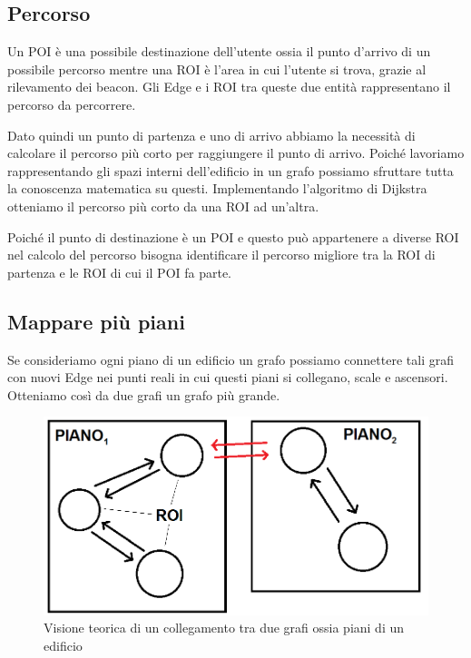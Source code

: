 \documentclass[../ManualeSviluppatore.tex]{subfiles}
\begin{document}
	
	\subsection{Percorso}
	Un POI è una possibile destinazione dell'utente ossia il punto d'arrivo di un possibile percorso mentre una ROI è l'area in cui l'utente si trova, grazie al rilevamento dei \gls{beacon}. Gli Edge e i ROI tra queste due entità rappresentano il percorso da percorrere.
	
	Dato quindi un punto di partenza e uno di arrivo abbiamo la necessità di calcolare il percorso più corto per raggiungere il punto di arrivo. Poiché lavoriamo rappresentando gli spazi interni dell'edificio in un grafo possiamo sfruttare tutta la conoscenza matematica su questi.
	Implementando l'algoritmo di Dijkstra otteniamo il percorso più corto da una ROI ad un'altra.
	
	Poiché il punto di destinazione è un POI e questo può appartenere a diverse ROI nel calcolo del percorso bisogna identificare il percorso migliore tra la ROI di partenza e le ROI di cui il POI fa parte.

	
	
	\subsection{Mappare più piani}
	
		Se consideriamo ogni piano di un edificio un grafo possiamo connettere tali grafi con nuovi Edge nei punti reali in cui questi piani si collegano, scale e ascensori. Otteniamo così da due grafi un grafo più grande.
		
		\begin{figure} [h]
			\centering
			\includegraphics[scale=0.4]{img/GRAFI-CONNESSI}
			\caption{Visione teorica di un collegamento tra due grafi ossia piani di un edificio}
			\label{fig:GRAFI-CONNESSI}
	\end{figure}
	
\end{document}
